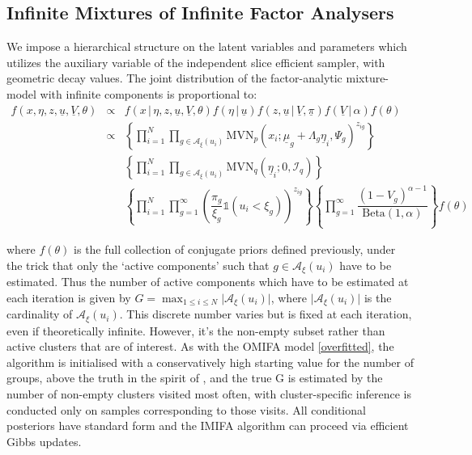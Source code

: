 \documentclass[a4paper,12pt,fleqn]{article}
\numberwithin{equation}{section}
\newcommand{\indicator}[1]{\mathds{1}{\left( {#1} \right) }}
\def\given{\,|\,}
\begin{document}
\subsection[Infinite Mixtures of Infinite Factor Analysers]{Infinite Mixtures of Infinite Factor Analysers}
We impose a hierarchical structure on the latent variables and parameters which utilizes the auxiliary variable of the independent slice efficient sampler, with geometric
decay values. The joint
distribution of the factor-analytic mixture-model with infinite components is proportional to:
\begin{eqnarray}
	f\left(x,\eta,z,\underline{u},\underline{V},\theta\right)&\propto& f\left(x \given \eta,z,\underline{u},\underline{V},\theta\right)f\left(\eta \given \underline{u}\right)f\left(z,\underline{u} \given \underline{V},\underline{\pi}\right)f\left(\underline{V} \given \alpha\right)f\left(\theta\right) \nonumber\\
	&\propto & \left\{\prod_{i=1}^N \prod_{g \in \mathcal{A}_\xi\left(u_i\right)} \textrm{MVN}_p\left(x_i; \underline{\mu}_g + \Lambda_g\underline{\eta}_{i}, \Psi_g\right)^{z_{ig}}\right\} \nonumber\\
	&&\left\{\prod_{i=1}^N \prod_{g \in \mathcal{A}_\xi\left(u_i\right)} \textrm{MVN}_q\left(\underline{\eta}_{i};0,\mathcal{I}_q\right)\right\} \nonumber\\
	&& \left\{ \prod_{i=1}^N \prod_{g=1}^\infty \left(\dfrac{\pi_g}{\xi_g} \indicator{u_i<\xi_g}\right)^{z_{ig}}\right\} \left\{ \prod_{g=1}^\infty \dfrac{(1-V_g)^{\alpha-1}}{\textrm{Beta}\left(1,	\alpha\right)}\right \}f(\theta)\label{eq:43}
\end{eqnarray}

\noindent where $f(\theta)$ is the full collection of conjugate priors defined previously, under the trick that only the `active components' such that $g \in  \mathcal{A}_\xi\left(u_i\right)$ have to be estimated. Thus the number of active components which have to be estimated at each iteration is given by $G=\max_{1 \leq i \leq N} \vert\mathcal{A}_\xi\left(u_i\right)\vert$, where $\vert\mathcal{A}_\xi\left(u_i\right)\vert$ is the cardinality of $\mathcal{A}_\xi\left(u_i\right)$. This discrete number varies but is fixed at each iteration, even if theoretically infinite. However, it's the non-empty subset rather than active clusters that are of interest. As with the OMIFA model \ref{overfitted}, the algorithm is initialised with a conservatively high starting value for the number of groups, above the truth in the spirit of \citet{Hastie2014}, and the true G is estimated by the number of non-empty clusters visited most often, with cluster-specific inference is
conducted only on samples corresponding to those visits. All conditional posteriors have standard form and the IMIFA algorithm can proceed via efficient Gibbs updates. 
\end{document}
